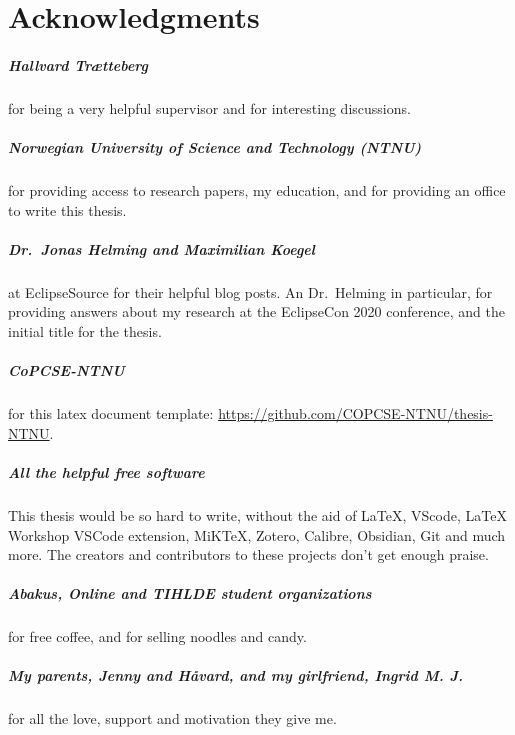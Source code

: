 \cleardoublepage{} %
\chapter*{Acknowledgments}

\paragraph*{Hallvard Trætteberg} for being a very helpful supervisor
and for interesting discussions.

\paragraph*{Norwegian University of Science and Technology (NTNU)} for providing access to research papers, my education, and for providing an office to write this thesis. 

\paragraph*{Dr.\ Jonas Helming and Maximilian Koegel} at EclipseSource for their helpful blog posts. An Dr.\ Helming in particular, for providing answers about my research at the EclipseCon 2020 conference, and the initial title for the thesis.

\paragraph*{CoPCSE-NTNU} for this latex document template: \href{https://github.com/COPCSE-NTNU/thesis-NTNU}{https://github.com/COPCSE-NTNU/thesis-NTNU}.

\paragraph*{All the helpful free software} This thesis would be so hard to write,
without the aid of \LaTeX, VScode, LaTeX Workshop VSCode extension, MiKTeX, Zotero, Calibre, Obsidian, Git and much more.
The creators and contributors to these projects don't get enough praise.

\paragraph*{Abakus, Online and TIHLDE student organizations} for free coffee, and for selling noodles and candy.

\paragraph*{My parents, Jenny and Håvard, and my girlfriend, Ingrid M. J.} for all the love, support and motivation they give me.



